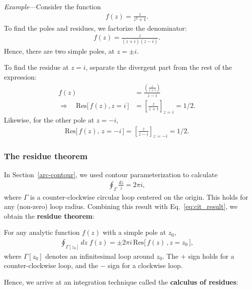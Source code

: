 \documentclass[10pt,a4paper]{article}
\begin{document}
\begin{framed}\noindent
  \textit{Example}---Consider the function
  \begin{align}
    f(z) = \frac{z}{z^2 + 1}.
  \end{align}
To find the poles and residues, we factorize the denominator:
\begin{align}
  f(z) = \frac{z}{(z+i)(z-i)}.
\end{align}
Hence, there are two simple poles, at $z = \pm i$.

To find the residue at $z = i$, separate the divergent part from the
rest of the expression:
\begin{align}
  f(z) &= \frac{\left(\frac{z}{z+i}\right)}{z-i} \\
  \Rightarrow\quad \mathrm{Res}\big[\,f(z), z=i\,\big]
  &= \left[\frac{z}{z+i}\right]_{z=i} = 1/2.
\end{align}
Likewise, for the other pole at $z = -i$,
\begin{align}
  \mathrm{Res}\big[\,f(z), \, z = -i\,\big] = \left[\frac{z}{z-i}\right]_{z=-i} = 1/2.
\end{align}
\end{framed}

\subsubsection{The residue theorem}
\label{the-residue-theorem}

In Section~\ref{arc-contour}, we used contour parameterization to
calculate
\begin{align}
  \oint_{\Gamma} \frac{dz}{z} = 2\pi i,
\end{align}
where $\Gamma$ is a counter-clockwise circular loop centered on the
origin. This holds for any (non-zero) loop radius.  Combining this
result with Eq.~\eqref{eq:cit_result}, we obtain the \textbf{residue
  theorem}:

\begin{framed}
  \noindent
  For any analytic function $f(z)$ with a simple pole at $z_0$,
  \begin{align}
    \oint_{\Gamma[z_0]} dz \; f(z) = \pm 2\pi i \, \mathrm{Res}\big[\,f(z)\,, z = z_0 \,\big],
  \end{align}
  where $\Gamma[z_0]$ denotes an infinitesimal loop around $z_0$.  The
  $+$ sign holds for a counter-clockwise loop, and the $-$ sign for a
  clockwise loop.
\end{framed}

\noindent
Hence, we arrive at an integration technique called the
\textbf{calculus of residues}:
\end{document}
